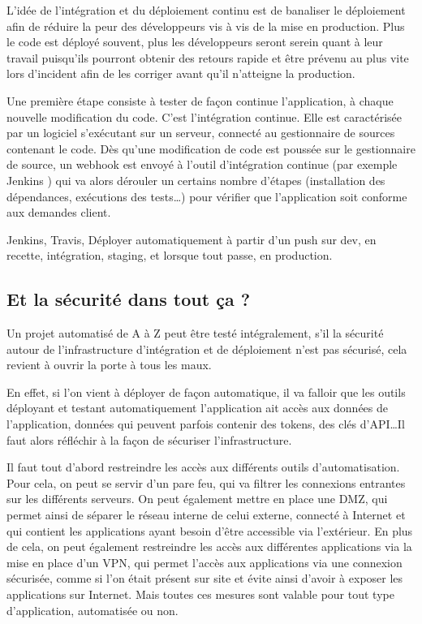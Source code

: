 L'idée de l'intégration et du déploiement continu est de banaliser le déploiement afin de réduire la peur des développeurs vis à vis de la mise en production. Plus le code est déployé souvent, plus les développeurs seront serein quant à leur travail puisqu'ils pourront obtenir des retours rapide et être prévenu au plus vite lors d'incident afin de les corriger avant qu'il n'atteigne la production.

Une première étape consiste à tester de façon continue l'application, à chaque nouvelle modification du code. C'est l'intégration continue. Elle est caractérisée par un logiciel s'exécutant sur un serveur, connecté au gestionnaire de sources contenant le code. Dès qu'une modification de code est poussée sur le gestionnaire de source, un \gls{webhook}  est envoyé à l'outil d'intégration continue (par exemple Jenkins ) qui va alors dérouler un certains nombre d'étapes (installation des dépendances, exécutions des tests\ldots) pour vérifier que l'application soit  conforme aux demandes client.   

Jenkins, Travis, Déployer automatiquement à partir d'un push sur dev, en recette, intégration, staging, et lorsque tout passe, en production.

\subsection{Et la sécurité dans tout ça ?}

Un projet automatisé de A à Z peut être testé intégralement, s'il la sécurité autour de l'infrastructure d'intégration et de déploiement n'est pas sécurisé, cela revient à ouvrir la porte à tous les maux. 

En effet, si l'on vient à déployer de façon automatique, il va falloir que les outils déployant et testant automatiquement l'application ait accès aux données de l'application, données qui peuvent parfois contenir des tokens, des clés d'\gls{API}\ldots Il faut alors réfléchir à la façon de sécuriser l'infrastructure. 

Il faut tout d'abord restreindre les accès aux différents outils d'automatisation. Pour cela, on peut se servir d'un pare feu, qui va filtrer les connexions entrantes sur les différents serveurs. On peut également mettre en place une \gls{DMZ}, qui permet ainsi de séparer le réseau interne de celui externe, connecté à Internet et qui contient les applications ayant besoin d'être accessible via l'extérieur. En plus de cela, on peut également restreindre les accès aux différentes applications via la mise en place d'un \gls{VPN}, qui permet l'accès aux applications via une connexion sécurisée, comme si l'on était présent sur site et évite ainsi d'avoir à exposer les applications sur Internet. Mais toutes ces mesures sont valable pour tout type d'application, automatisée ou non. 


